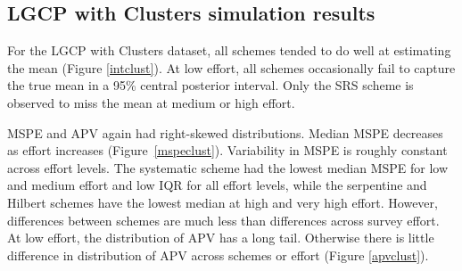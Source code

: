 \documentclass[review]{elsarticle}
\begin{document}
\subsection{LGCP with Clusters simulation results}

For the LGCP with Clusters dataset, all schemes tended to do well at
estimating the mean (Figure \ref{intclust}). At low effort, all schemes
occasionally fail to capture the true mean in a 95\% central posterior
interval. Only the SRS scheme is observed to miss the mean at medium or high
effort.

MSPE and APV again had right-skewed distributions. Median MSPE decreases as
effort increases (Figure~\ref{mspeclust}). Variability in MSPE is roughly
constant across effort levels. The systematic scheme had the lowest median
MSPE for low and medium effort and low IQR for all effort levels, while the
serpentine and Hilbert schemes have the lowest median at high and very high
effort. However, differences between schemes are much less than differences
across survey effort. At low effort, the distribution of APV has a long tail.
Otherwise there is little difference in distribution of APV across schemes or
effort (Figure \ref{apvclust}).
\end{document}

